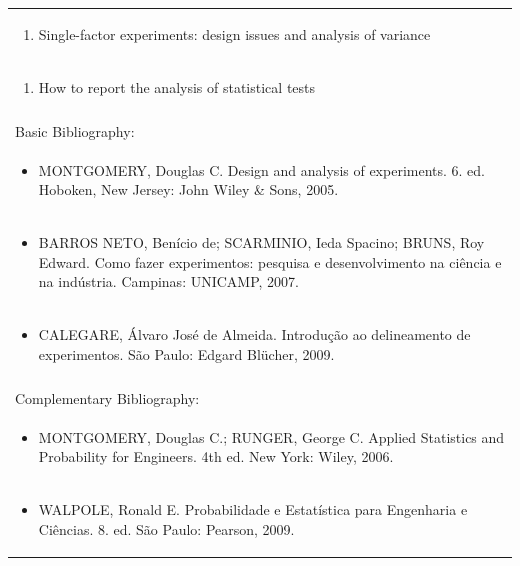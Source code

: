 \documentclass[11pt]{article}
\begin{document}
\begin{center}
\begin{longtable}{|p{4cm}|p{4cm}|p{4cm}|p{4cm}|}
\multicolumn{4}{|p{\dimexpr 16cm + 6\tabcolsep\relax}|}{\begin{enumerate}[start=19]\item Single-factor experiments: design issues and analysis of variance\end{enumerate}}\\
\multicolumn{4}{|p{\dimexpr 16cm + 6\tabcolsep\relax}|}{\begin{enumerate}[start=20]\item How to report the analysis of statistical tests\end{enumerate}}\\
\multicolumn{4}{|p{\dimexpr 16cm + 6\tabcolsep\relax}|}{}\\
\hline
\multicolumn{4}{|p{16cm}|}{Basic Bibliography:}\\*
\multicolumn{4}{|p{\dimexpr 16cm + 6\tabcolsep\relax}|}{\begin{itemize}\item MONTGOMERY, Douglas C. Design and analysis of experiments. 6. ed. Hoboken, New Jersey: John Wiley \& Sons, 2005.\end{itemize}}\\
\multicolumn{4}{|p{\dimexpr 16cm + 6\tabcolsep\relax}|}{\begin{itemize}\item BARROS NETO, Benício de; SCARMINIO, Ieda Spacino; BRUNS, Roy Edward. Como fazer experimentos: pesquisa e desenvolvimento na ciência e na indústria. Campinas: UNICAMP, 2007.\end{itemize}}\\
\multicolumn{4}{|p{\dimexpr 16cm + 6\tabcolsep\relax}|}{\begin{itemize}\item CALEGARE, Álvaro José de Almeida. Introdução ao delineamento de experimentos. São Paulo: Edgard Blücher, 2009.\end{itemize}}\\
\multicolumn{4}{|p{16cm}|}{}\\
\hline
\multicolumn{4}{|p{16cm}|}{Complementary Bibliography:}\\*
\multicolumn{4}{|p{\dimexpr 16cm + 6\tabcolsep\relax}|}{\begin{itemize}\item MONTGOMERY, Douglas C.; RUNGER, George C. Applied Statistics and Probability for Engineers. 4th ed. New York: Wiley, 2006.\end{itemize}}\\
\multicolumn{4}{|p{\dimexpr 16cm + 6\tabcolsep\relax}|}{\begin{itemize}\item WALPOLE, Ronald E. Probabilidade e Estatística para Engenharia e Ciências. 8. ed. São Paulo: Pearson, 2009.\end{itemize}}\\

\end{longtable}
\end{center}
\end{document}
